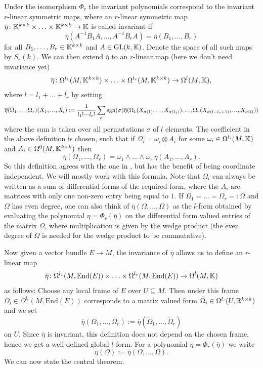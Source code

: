 Under the isomorphism $\Phi_r$ the invariant polynomials correspond to the invariant $r$-linear symmetric maps, where an $r$-linear symmetric map $\overline{\eta} \colon \mathbb{K}^{k \times k} \times \ldots \times \mathbb{K}^{k \times k} \to \mathbb{K}$ is called invariant if 
\[
\overline{\eta}(A^{-1}B_1A,\ldots,A^{-1}B_rA) = \overline{\eta}(B_1,\ldots,B_r)
\]
for all $B_1,\ldots,B_r \in \mathbb{K}^{k \times k}$ and $A \in \mathrm{GL}(k,\mathbb{K})$. Denote the space of all such maps by $S_r(k)$. We can then extend $\overline{\eta}$ to an $r$-linear map (here we don't need invariance yet)
\[
\overline{\eta} \colon \Omega^{l_1}(M,\mathbb{K}^{k \times k}) \times \ldots \times \Omega^{l_r}(M,\mathbb{K}^{k \times k}) \to \Omega^{l}(M,\mathbb{K}),
\]
where $l = l_1 + \ldots + l_r$ by setting 
\[
\overline{\eta}(\Omega_1,\scalebox{0.7}[1]{\ldots},\Omega_r)(X_1,\scalebox{0.7}[1]{\ldots},X_l) := \frac{1}{l_1! \scalebox{0.7}[1]{$\cdots$} l_r!} \sum_{\sigma} \mathrm{sgn}(\sigma) \overline{\eta}(\Omega_1(X_{\sigma(1)}, \scalebox{0.7}[1]{\ldots} ,X_{\sigma(l_1)}),\scalebox{0.7}[1]{\ldots}, \Omega_r(X_{\sigma(l-l_r + 1)}, \scalebox{0.7}[1]{\ldots} ,X_{\sigma(l)}))
\]
where the sum is taken over all permutations $\sigma$ of $l$ elements. The coefficient in the above definition is chosen, such that if $\Omega_i = \omega_i \otimes A_i$ for some $\omega_i \in \Omega^{l_i}(M,\mathbb{K})$ and $A_i \in \Omega^0(M,\mathbb{K}^{k \times k})$ then
\[
\overline{\eta}(\Omega_1,\ldots,\Omega_r) = \omega_1 \wedge \ldots \wedge \omega_r \, \overline{\eta}(A_1,\ldots,A_r).
\]
So this definition agrees with the one in \cite{emilia_globale_ana}, but has the benefit of being coordinate independent. We will mostly work with this formula. Note that $\Omega_i$ can always be written as a sum of differential forms of the required form, where the $A_i$ are matrices with only one non-zero entry being equal to $1$. If $\Omega_1 = \ldots = \Omega_r =: \Omega$ and $\Omega$ has even degree, one can also think of $\overline{\eta}(\Omega,\ldots,\Omega)$ as the $l$-form obtained by evaluating the polynomial $\eta = \Phi_r(\overline{\eta})$ on the differential form valued entries of the matrix $\Omega$, where multiplication is given by the wedge product (the even degree of $\Omega$ is needed for the wedge product to be commutative).

Now given a vector bundle $E \to M$, the invariance of $\overline{\eta}$  allows us to define an $r$-linear map 
\[
\overline{\eta} \colon \Omega^{l_1}(M,\mathrm{End}(E)) \times \ldots \times \Omega^{l_r}(M,\mathrm{End}(E)) \to \Omega^{l}(M,\mathbb{K})
\]
as follows: Choose any local frame of $E$ over $U \subseteq M$. Then under this frame $\Omega_i \in \Omega^{l_i}(M,\mathrm{End}(E))$ corresponds to a matrix valued form $\tilde{\Omega}_i \in \Omega^{l_i}(U,\mathbb{R}^{k \times k})$ and we set 
\[
\overline{\eta}(\Omega_1,\ldots,\Omega_r) := \overline{\eta}(\tilde{\Omega}_1,\ldots,\tilde{\Omega}_r)
\]
on $U$. Since $\overline{\eta}$ is invariant, this definition does not depend on the chosen frame, hence we get a well-defined global $l$-form. For a polynomial $\eta = \Phi_r(\overline{\eta})$ we write 
\[
\eta(\Omega) := \overline{\eta}(\Omega,\ldots,\Omega).
\]
We can now state the central theorem.

